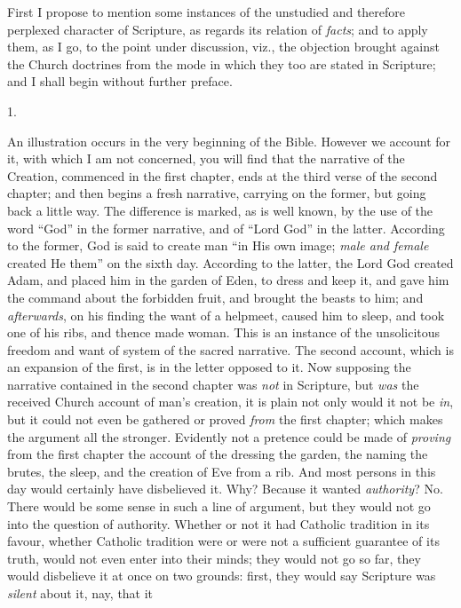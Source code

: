 First I propose to mention some instances of the unstudied and
therefore perplexed character of Scripture, as regards its relation of
\emph{facts}; and to apply them, as I go, to the point under
discussion, viz., the objection brought against the Church doctrines
from the mode in which they too are stated in Scripture; and I shall
begin without further preface.

1.

An illustration occurs in the very beginning of the Bible. However
we account for it, with which I am not concerned, you will find that
the narrative of the Creation, commenced in the first chapter, ends at
the third verse of the second chapter; and then begins a fresh
narrative, carrying on the former, but going back a little way. The
difference is marked, as is well known, by the use of the word
``God'' in the former narrative, and of ``Lord God''
in the latter. According to the former, God is said to create man
``in His own image; \emph{male and female} created He them''
on the sixth day. According to the latter, the Lord God created Adam,
and placed him in the garden of Eden, to dress and keep it, and gave
him the command about the forbidden fruit, and brought the beasts to
him; and \emph{afterwards}, on his finding the want of a helpmeet,
caused him to sleep, and took one of his ribs, and thence made woman.
This is an instance of the unsolicitous freedom and want of system of
the sacred narrative. The second account, which is an expansion of the
first, is in the letter opposed to it. Now supposing the narrative
contained in the second chapter was \emph{not} in Scripture, but \emph{was}
the received Church account of man's creation, it is plain not only
would it not be \emph{in}, but it could not even be gathered or proved
\emph{from} the first chapter; which makes the argument all the
stronger. Evidently not a pretence could be made of \emph{proving}
from the first chapter the account of the dressing the garden, the
naming the brutes, the sleep, and the creation of Eve from a rib. And
most persons in this day would certainly have disbelieved it. Why?
Because it wanted \emph{authority}? No. There would be some sense in
such a line of argument, but they would not go into the question
of authority. Whether or not it had Catholic tradition in its favour,
whether Catholic tradition were or were not a sufficient guarantee of
its truth, would not even enter into their minds; they would not go so
far, they would disbelieve it at once on two grounds: first, they
would say Scripture was \emph{silent} about it, nay, that it
